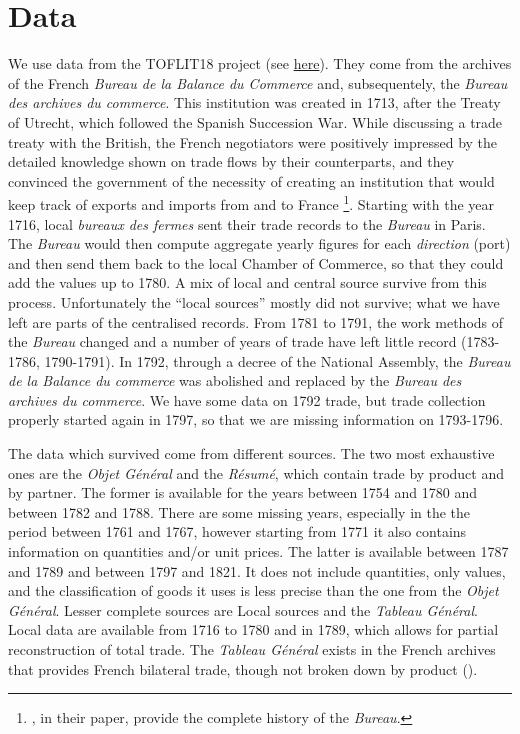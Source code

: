 \documentclass[12pt,a4paper,notitlepage,english]{article}
\begin{document}
\section{Data} \label{dataset}
We use data from the TOFLIT18 project (see \href{http://toflit18.medialab.sciences-po.fr/\#/home}{here}). They come from the archives of the French \textit{Bureau de la Balance du Commerce} and, subsequentely, the \textit{Bureau des archives du commerce}.
This institution was created in 1713, after the Treaty of Utrecht, which followed the Spanish Succession War.
While discussing a trade treaty with the British, the French negotiators were positively impressed by the detailed knowledge shown on trade flows by their counterparts, and they convinced the government of the necessity of creating an institution that would keep track of exports and imports from and to France \citep{Charles2011}\footnote{\cite{Charles2011}, in their paper, provide the complete history of the \textit{Bureau}.}.
Starting with the year 1716, local \textit{bureaux des fermes} sent their trade records to the \textit{Bureau} in Paris.
The \textit{Bureau} would then compute aggregate yearly figures for each \textit{direction} (port) and then send them back to the local Chamber of Commerce, so that they could add the values up to 1780.
A mix of local and central source survive from this process. Unfortunately the ``local sources'' mostly did not survive; what we have left are parts of the centralised records.
From 1781 to 1791, the work methods of the \textit{Bureau} changed and a number of years of trade have left little record (1783-1786, 1790-1791).
In 1792, through a decree of the National Assembly, the \textit{Bureau de la Balance du commerce} was abolished and replaced by the \textit{Bureau des archives du commerce}. We have some data on 1792 trade, but trade collection properly started again in 1797, so that we are missing information on 1793-1796.

The data which survived come from different sources.
The two most exhaustive ones are the \textit{Objet Général} and the \textit{Résumé}, which contain trade by product and by partner. 
The former is available for the years between 1754 and 1780 and between 1782 and 1788. There are some missing years, especially in the the period between 1761 and 1767, however starting from 1771 it also contains information on quantities and/or unit prices.
The latter is available between 1787 and 1789 and between 1797 and 1821. It does not include quantities, only values, and the classification of goods it uses is less precise than the one from the \textit{Objet Général}.
Lesser complete sources are Local sources and the \textit{Tableau Général}. Local data are available from 1716 to 1780 and in 1789, which allows for partial reconstruction of total trade.
The \textit{Tableau Général} exists in the French archives that provides French bilateral trade, though not broken down by product (\cite{Romano1957}). 
\end{document}

